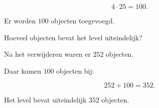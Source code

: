 \documentclass{ximera}
\begin{document}
\begin{oefening}{\oefU\ESS}
\begin{question}
\begin{oplossing}

\[
4\cdot25=100.
\]

Er worden \(100\) objecten toegevoegd.

\end{oplossing}

\end{question}


\begin{question}

Hoeveel objecten bevat het level uiteindelijk?

\begin{oplossing}

Na het verwijderen waren er \(252\) objecten.

Daar komen \(100\) objecten bij:

\[
252+100=352.
\]

Het level bevat uiteindelijk \(352\) objecten.

\end{oplossing}

\end{question}

\end{oefening}


\end{document}
